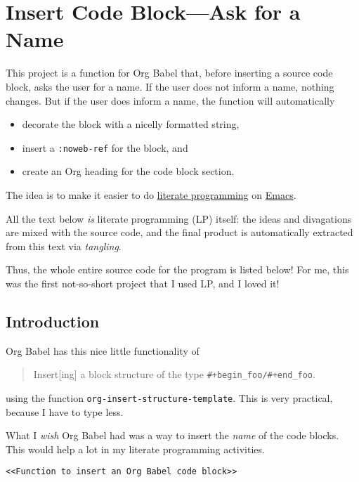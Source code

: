 \documentclass[11pt]{article}
\author{Rafael Beirigo}
\date{\today}
\title{}
\begin{document}
\tableofcontents


\section{Insert Code Block---Ask for a Name}
\label{sec:org63cfe8d}

This project is a function for Org Babel that, before inserting a
source code block, asks the user for a name.  If the user does not
inform a name, nothing changes.  But if the user does inform a name,
the function will automatically
\begin{itemize}
\item decorate the block with a nicelly formatted string,
\item insert a \texttt{:noweb-ref} for the block, and
\item create an Org heading for the code block section.
\end{itemize}

The idea is to make it easier to do \href{https://en.wikipedia.org/wiki/Literate\_programming}{literate programming} on \href{https://en.wikipedia.org/wiki/GNU\_Emacs}{Emacs}.

All the text below \emph{is} literate programming (LP) itself: the ideas
and divagations are mixed with the source code, and the final product
is automatically extracted from this text via \emph{tangling}.

Thus, the whole entire source code for the program is listed below!
For me, this was the first not-so-short project that I used LP, and I
loved it!

\subsection{Introduction}
\label{sec:org449be63}

Org Babel has this nice little functionality of

\begin{quote}
Insert[ing] a block structure of the type \texttt{\#+begin\_foo/\#+end\_foo}.
\end{quote}

using the function \texttt{org-insert-structure-template}.  This is very
practical, because I have to type less.

What I \emph{wish} Org Babel had was a way to insert the \emph{name} of the code
blocks.  This would help a lot in my literate programming activities.

\begin{verbatim}
<<Function to insert an Org Babel code block>>
\end{verbatim}
\end{document}
